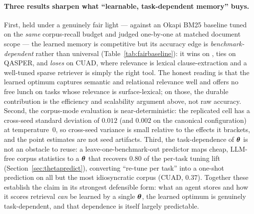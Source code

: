 \paragraph{Three results sharpen what ``learnable, task-dependent memory'' buys.}
First, held under a genuinely fair light --- against an Okapi BM25 baseline tuned
on the \emph{same} corpus-recall budget and judged one-by-one at matched document
scope --- the learned memory is competitive but its accuracy edge is
\emph{benchmark-dependent} rather than universal (Table~\ref{tab:fairbaseline}):
it wins on \FB{}, ties on QASPER, and \emph{loses} on CUAD, where relevance is
lexical clause-extraction and a well-tuned sparse retriever is simply the right
tool. The honest reading is that the learned optimum captures semantic and
relational relevance well and offers no free lunch on tasks whose relevance is
surface-lexical; on those, the durable contribution is the efficiency and
scalability argument above, not raw accuracy. Second, the corpus-mode evaluation
is near-deterministic: the replicated \FB{} cell has a cross-seed standard
deviation of $0.012$ (and $0.002$ on the canonical configuration) at
temperature~0, so cross-seed variance is small relative to the effects it
brackets, and the point estimates are not seed artifacts. Third, the
task-dependence of $\boldsymbol{\theta}$ is not an obstacle to reuse: a leave-one-benchmark-out
predictor maps cheap, LLM-free corpus statistics to a $\boldsymbol{\theta}$ that recovers
$0.80$ of the per-task tuning lift (Section~\ref{sec:thetapredict}),
converting ``re-tune per task'' into a one-shot prediction on all
but the most idiosyncratic corpus (CUAD, $0.37$). Together these establish the
claim in its strongest defensible form: what an agent stores and how it scores
retrieval \emph{can} be learned by a single $\boldsymbol{\theta}$, the learned optimum is
genuinely task-dependent, and that dependence is itself largely predictable.

